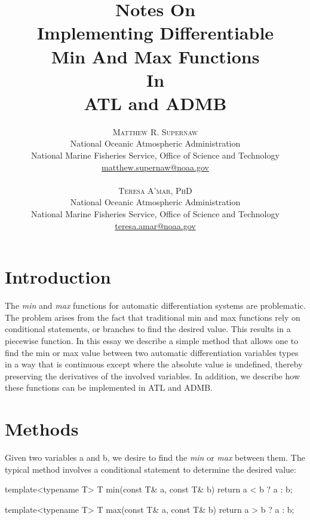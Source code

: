 \documentclass[oneside]{article}
\title{\vspace{-15mm}\fontsize{24pt}{10pt}\selectfont\textbf{Notes On \protect\\  Implementing Differentiable  \protect\\ Min And Max Functions \protect\\
In \protect\\
ATL and  ADMB}} %
\author{
\large
\textsc{Matthew R. Supernaw}\\[2mm] %
\normalsize National Oceanic Atmospheric Administration \\ %
\normalsize National Marine Fisheries Service, Office of Science and Technology\\ %
\normalsize \href{mailto:matthew.supernaw@noaa.gov}{matthew.supernaw@noaa.gov} \\ %
\\
\textsc{Teresa A'mar, PhD}\\[2mm] %
\normalsize National Oceanic Atmospheric Administration \\ %
\normalsize National Marine Fisheries Service, Office of Science and Technology\\ %
\normalsize \href{mailto:teresa.amar@noaa.gov}{teresa.amar@noaa.gov} \\%
\vspace{-5mm}
}
\date{}
\begin{document}
\maketitle %

\thispagestyle{fancy} %


%
%
%


\newpage
\tableofcontents
\newpage

\section{Introduction}
The \textit{min} and \textit{max} functions for automatic differentiation systems are problematic. The problem arises from the fact that traditional min and max functions rely on conditional statements, or branches to find the desired value. This results in a piecewise function.  In this essay we describe a simple method that allows one to find the min or max value between two automatic differentiation variables types in a way that is continuous except where the absolute value is undefined, thereby preserving the derivatives of the involved variables. In addition, we describe how these functions can be implemented in ATL and ADMB.


\section{Methods}
Given two variables a and b, we desire to find the \textit{min}  or \textit{max} between them. The typical method involves a conditional statement to determine the desired value:

\begin{cppsource}
template<typename T>
T min(const T& a, const T& b){
   return a < b ? a : b;
} 

template<typename T>
T max(const T& a, const T& b){
   return a > b ? a : b;
} 

\end{cppsource}
\end{document}
